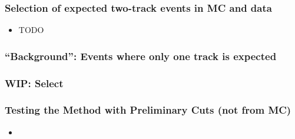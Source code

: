 \documentclass[18pt]{beamer}
\begin{document}
  \begin{frame}
    \frametitle{Selection of expected two-track events in MC and data}
    \begin{itemize}
    \item TODO
    \end{itemize}
  \end{frame}

  \begin{frame}    
    \frametitle{``Background'': Events where only one track is expected}
    
  \end{frame}

  \begin{frame}
    \frametitle{WIP: Select }
    
  \end{frame}

  \begin{frame}
    \frametitle{Testing the Method with Preliminary Cuts (not from MC)}
    \begin{itemize}
    \item 
    \end{itemize}
  \end{frame}

  
\end{document}
